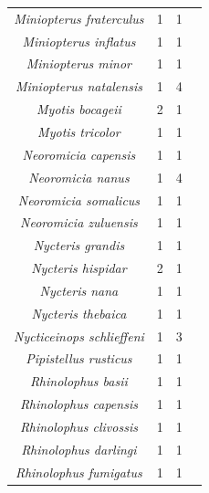 \documentclass[9pt,twoside,lineno]{pnas-new}
\begin{document}
\begin{longtable}{cccp{5cm}}
\textit{Miniopterus fraterculus} & 1 & 1 & \cite{Bernard1980Reproductive1906}\\
\textit{Miniopterus inflatus} & 1 & 1 & \cite{Brosset1969LaGabon}\\
\textit{Miniopterus minor} & 1 & 1 & \cite{McWilliam1988TheTropics}\\
\textit{Miniopterus natalensis} & 1 & 4 & \cite{Bernard1996OnZimbabwe,Bernard1980Reproductive1906,Bernard1994EffectsSchreibersii.,vanderMerwe1979FoetalNatalensis}\\
\textit{Myotis bocageii} & 2 & 1 & \cite{Brosset1966LaChiropteres}\\
\textit{Myotis tricolor} & 1 & 1 & \cite{Bernard1981MonthlyChiroptera}\\
\textit{Neoromicia capensis} & 1 & 1 & \cite{Merwe1994ReproductiveAfrica}\\
\textit{Neoromicia nanus} & 1 & 4 & \cite{vanderMerwe2006Aspects1833,LaVal1977ReproductionNanus,Bernard1997SpermMalawi,OShea1980EcologicalCommunity}\\
\textit{Neoromicia somalicus} & 1 & 1 & \cite{OShea1980EcologicalCommunity}\\
\textit{Neoromicia zuluensis} & 1 & 1 & \cite{Happold1990ReproductiveAfrica}\\
\textit{Nycteris grandis} & 1 & 1 & \cite{FENTON1987ForagingZimbabwe}\\
\textit{Nycteris hispidar} & 2 & 1 & \cite{Verschuren1957EcologieChiropteres}\\
\textit{Nycteris nana} & 1 & 1 & \cite{Verschuren1957EcologieChiropteres}\\
\textit{Nycteris thebaica} & 1 & 1 & \cite{Bernard1982FemaleAfrica}\\
\textit{Nycticeinops schlieffeni} & 1 & 3 & \cite{VanderMerweN.J.Rautenbach1988AVespertilionidae,OShea1980EcologicalCommunity,Happold1990ReproductiveAfrica}\\
\textit{Pipistellus rusticus} & 1 & 1 & \cite{vanderMerwe1990ReproductionAfrica.}\\
\textit{Rhinolophus basii} & 1 & 1 & \cite{Happold1990ReproductiveAfrica}\\
\textit{Rhinolophus capensis} & 1 & 1 & \cite{Bernard1983ReproductionAfrica}\\
\textit{Rhinolophus clivossis} & 1 & 1 & \cite{Bernard1983ReproductionAfrica}\\
\textit{Rhinolophus darlingi} & 1 & 1 & \cite{Smithers1979CheckRhodesia}\\
\textit{Rhinolophus fumigatus} & 1 & 1 & \cite{Happold1990ReproductiveAfrica}\\

\end{longtable}
\end{document}
